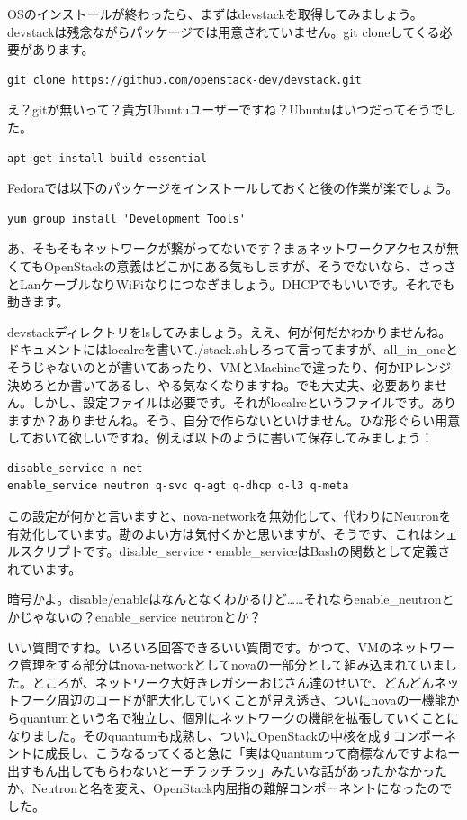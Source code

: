 \documentclass[9pt,b5paper,tombo,openany,dvipdfmx]{jsbook}
\begin{document}
OSのインストールが終わったら、まずはdevstackを取得してみましょう。devstackは残念ながらパッケージでは用意されていません。git cloneしてくる必要があります。

\begin{lstlisting}
git clone https://github.com/openstack-dev/devstack.git
\end{lstlisting}


え？gitが無いって？貴方Ubuntuユーザーですね？Ubuntuはいつだってそうでした。

\begin{lstlisting}
apt-get install build-essential
\end{lstlisting}

Fedoraでは以下のパッケージをインストールしておくと後の作業が楽でしょう。

\begin{lstlisting}
yum group install 'Development Tools'
\end{lstlisting}

あ、そもそもネットワークが繋がってないです？まぁネットワークアクセスが無くてもOpenStackの意義はどこかにある気もしますが、そうでないなら、さっさとLanケーブルなりWiFiなりにつなぎましょう。DHCPでもいいです。それでも動きます。

devstackディレクトリをlsしてみましょう。ええ、何が何だかわかりませんね。ドキュメントにはlocalrcを書いて./stack.shしろって言ってますが、all\_in\_oneとそうじゃないのとが書いてあったり、VMとMachineで違ったり、何かIPレンジ決めろとか書いてあるし、やる気なくなりますね。でも大丈夫、必要ありません。しかし、設定ファイルは必要です。それがlocalrcというファイルです。ありますか？ありませんね。そう、自分で作らないといけません。ひな形ぐらい用意しておいて欲しいですね。例えば以下のように書いて保存してみましょう：

\begin{lstlisting}
disable_service n-net
enable_service neutron q-svc q-agt q-dhcp q-l3 q-meta
\end{lstlisting}

この設定が何かと言いますと、nova-networkを無効化して、代わりにNeutronを有効化しています。勘のよい方は気付くかと思いますが、そうです、これはシェルスクリプトです。disable\_service・enable\_serviceはBashの関数として定義されています。

暗号かよ。disable/enableはなんとなくわかるけど……それならenable\_neutronとかじゃないの？enable\_service neutronとか？

いい質問ですね。いろいろ回答できるいい質問です。かつて、VMのネットワーク管理をする部分はnova-networkとしてnovaの一部分として組み込まれていました。ところが、ネットワーク大好きレガシーおじさん達のせいで、どんどんネットワーク周辺のコードが肥大化していくことが見え透き、ついにnovaの一機能からquantumという名で独立し、個別にネットワークの機能を拡張していくことになりました。そのquantumも成熟し、ついにOpenStackの中核を成すコンポーネントに成長し、こうなるってくると急に「実はQuantumって商標なんですよねー出すもん出してもらわないとーチラッチラッ」みたいな話があったかなかったか、Neutronと名を変え、OpenStack内屈指の難解コンポーネントになったのでした。
\end{document}
